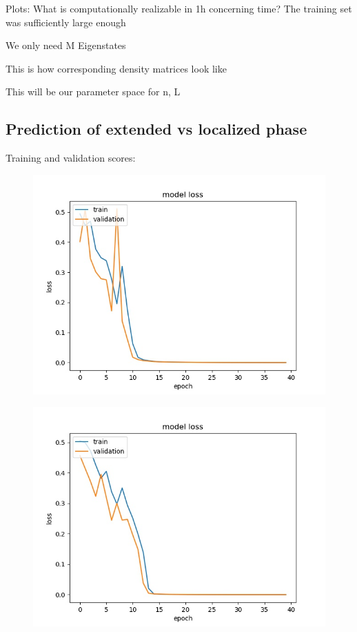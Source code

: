 \documentclass[reprint,amsmath,amssymb,aps,prb]{revtex4-2}
\begin{document}
Plots: 
What is computationally realizable in 1h concerning time?
The training set was sufficiently large enough 

We only need M Eigenstates

This is how corresponding density matrices look like

This will be our parameter space for n, L

\subsection{Prediction of extended vs localized phase}

Training and validation scores:

\begin{figure}[h!]
\centering
\includegraphics[width=0.7\linewidth]{../results/N10_loss_epochs}
\caption{}
\label{fig:N10_loss_epochs}
\end{figure}
\begin{figure}[h!]
	\centering
	\includegraphics[width=0.7\linewidth]{../results/N11_loss_epochs}
	\caption{}
	\label{fig:N11_loss_epochs}
\end{figure}
\end{document}
